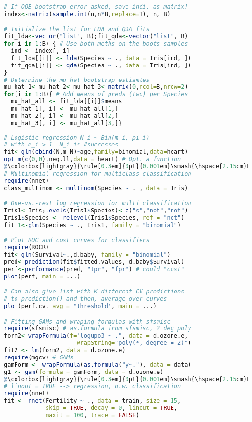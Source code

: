 \begin{lstlisting}[language=R]
# If OOB bootstrap error asked, save indi. as matrix!
index<-matrix(sample.int(n,n*B,replace=T), n, B)

# Initialize the list for LDA and QDA fits
fit_lda<-vector("list", B);fit_qda<-vector("list", B)
for(i in 1:B) { # Use both meths on the boots samples
  ind <- index[, i]
  fit_lda[[i]] <- lda(Species ~ ., data = Iris[ind, ])
  fit_qda[[i]] <- qda(Species ~ ., data = Iris[ind, ])
}
# Determine the mu_hat bootstrap estiamtes
mu_hat_1<-mu_hat_2<-mu_hat_3<-matrix(0,ncol=B,nrow=2) 
for(i in 1:B){ # Add means of preds (two) per Species
  mu_hat_all <- fit_lda[[i]]$means
  mu_hat_1[, i] <- mu_hat_all[1,]
  mu_hat_2[, i] <- mu_hat_all[2,]
  mu_hat_3[, i] <- mu_hat_all[3,]}
  
# Logistic regression N_i ~ Bin(m_i, pi_i)
# with m_i > 1. N_i is #successes 
fit<-glm(cbind(N,m-N)~age,family=binomial,data=heart)
optim(c(0,0),neg.ll,data = heart) # Opt. a function
@\colorbox{lightgray}{\rule[0.3em]{0pt}{0.001em}\smash{\hspace{2.15cm}Exercise 8\hspace{2.15cm}}}@
# Multinomial regression for multiclass classification
require(nnet)
class_multinom <- multinom(Species ~ . , data = Iris) 

# One-vs.-rest log regression for multi classification 
Iris1<-Iris;levels(Iris1$Species)<-c("s","not","not") 
Iris1$Species <- relevel(Iris1$Species, ref = "not") 
fit.1<-glm(Species ~ ., Iris1, family = "binomial")

# Plot ROC and cost curves for classifiers 
require(ROCR)
fit<-glm(Survival~.,d.baby, family = "binomial")
pred<-prediction(fit$fitted.values, d.baby$Survival)
perf<-performance(pred, "tpr", "fpr") # could "cost"
plot(perf, main = ...)

# Can also give list with K different CV predictions 
# to prediction() and then, average over curves
plot(perf.cv, avg = "threshold", main = ...) 

# Fitting GAMs and wraping formulas with sfsmisc
require(sfsmisc) # as.formula from sfsmisc, 2 deg poly
form2<-wrapFormula(f="logupo3 ~ .", data = d.ozone.e, 
                     wrapString="poly(*, degree = 2)") 
fit2 <- lm(form2, data = d.ozone.e)
require(mgcv) # GAMs
gamForm <- wrapFormula(as.formula("y~."), data = data)
g1 <- gam(formula = gamForm, data = d.ozone.e)
@\colorbox{lightgray}{\rule[0.3em]{0pt}{0.001em}\smash{\hspace{2.15cm}Exercise 9\hspace{2.15cm}}}@
# linout = TRUE --> regression, o.w. classification
require(nnet) 
fit <- nnet(Fertility ~ ., data = train, size = 15, 
            skip = TRUE, decay = 0, linout = TRUE, 
            maxit = 100, trace = FALSE)
            

\end{lstlisting}
